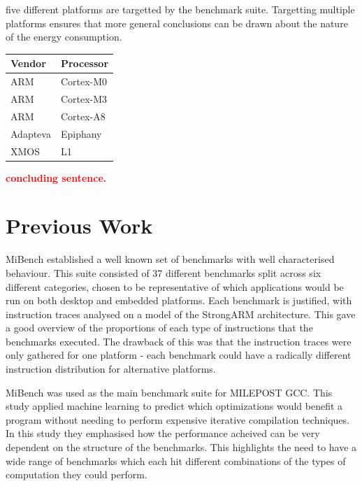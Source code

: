 \documentclass[twocolumn]{article}
\newcommand{\todo}[1]{\textbf{\textcolor{red}{#1}}}
\begin{document}
five different platforms are targetted by the benchmark suite. Targetting multiple platforms ensures that more general conclusions can be drawn about the nature of the energy consumption.

\begin{center}
	\begin{tabular}{l l}
		Vendor  & Processor \\
		\hline
		ARM		& Cortex-M0 \\
		ARM		& Cortex-M3 \\
		ARM 	& Cortex-A8 \\
		Adapteva& Epiphany \\
		XMOS	& L1 \\
	\end{tabular}
\end{center}

\todo{concluding sentence.}

\section{Previous Work}

MiBench established a well known set of benchmarks with well characterised behaviour. This suite consisted of 37 different benchmarks split across six different categories, chosen to be representative of which applications would be run on both desktop and embedded platforms. Each benchmark is justified, with instruction traces analysed on a model of the StrongARM architecture. This gave a good overview of the proportions of each type of instructions that the benchmarks executed. The drawback of this was that the instruction traces were only gathered for one platform - each benchmark could have a radically different instruction distribution for alternative platforms.

MiBench was used as the main benchmark suite for MILEPOST GCC\cite{Fursin2011}. This study applied machine learning to predict which optimizations would benefit a program without needing to perform expensive iterative compilation techniques. In this study they emphasised how the performance acheived can be very dependent on the structure of the benchmarks. This highlights the need to have a wide range of benchmarks which each hit different combinations of the types of computation they could perform.
\end{document}
